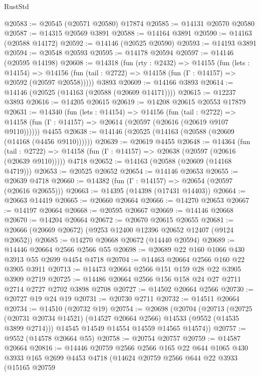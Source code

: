 \begin{lexlean}{RustStd}
\begin{coremodule}
@20583 := @20545 (@20571 @20580) @17874
@20585 := @14131 @20570 @20580
@20587 := @14315 @20569 @3891
@20588 := @14164 @3891
@20590 := @14163 (@20588 @14172)
@20592 := @14146 (@20525 @20590)
@20593 := @14193 @3891
@20594 := @20548 @20593
@20595 := @14178 @20594
@20597 := @14146 (@20595 @14198)
@20608 := @14318
    (fun (rty : @2432) =>
    @14155
      (fun (lets : @14154) =>
      @14156 (fun (tail : @2722) => @14158 (fun (Γ : @14157) => @20592 (@20597 @20558)))))
    @3893
@20609 := @14166 @3893
@20614 := @14146 (@20525 (@14163 (@20588 (@20609 @14171))))
@20615 := @12237 @3893
@20616 := @14205 @20615
@20619 := @14208 @20615 @20553 @17879
@20631 := @14340
    (fun (lets : @14154) =>
    @14156
      (fun (tail : @2722) =>
      @14158 (fun (Γ : @14157) => @20614 (@20597 (@20616 (@20619 @9107 @9110))))))
    @4455
@20638 := @14146 (@20525 (@14163 (@20588 (@20609 (@14168 (@4456 @9110))))))
@20639 := @20619 @4455
@20648 := @14364
    (fun (tail : @2722) => @14158 (fun (Γ : @14157) => @20638 (@20597 (@20616 (@20639 @9110)))))
    @4718
@20652 := @14163 (@20588 (@20609 (@14168 @4719)))
@20653 := @20525 @20652
@20654 := @14146 @20653
@20655 := @20639 @4718
@20660 := @14382 (fun (Γ : @14157) => @20654 (@20597 (@20616 @20655)))
@20663 := @14395 (@14398 (@17431 @14403))
@20664 := @20663 @14419
@20665 := @20660 @20664
@20666 := @14270 @20653
@20667 := @14197 @20664
@20668 := @20595 @20667
@20669 := @14146 @20668
@20670 := @14204 @20664
@20672 := @20670 @20615 @20655
@20681 := @20666 (@20669 @20672) (@9253 @12400 @12396 @20652 @12407 (@9124 @20652))
@20685 := @14270 @20668 @20672 (@14440 @20594)
@20689 := @14446 @20664 @2566 @2566 @55
@20698 := @20689 @22 @160 @1066 @430 @3913 @55 @2699 @4454 @4718
@20704 := @14463 @20664 @2566 @160 @22 @3905 @3911
@20713 := @14473 @20664 @2566 @151 @159 @28 @22 @3905 @3909 @2719
@20725 := @14486 @20664 @2566 @156 @158 @24 @27 @2711 @2714 @2727 @2702 @3898 @2708
@20727 := @14502 @20664 @2566
@20730 := @20727 @19 @24 @19
@20731 := @20730 @2711
@20732 := @14511 @20664
@20734 := @14510 (@20732 @19)
@20754 := @20698
    (@20704
      (@20713
        (@20725 (@20731 @20734 @14521) (@14527 @20664 @2566) @14533 (@9552 (@14535 @3899 @2714)))
        @14545
        @14549
        @14554
        @14559
        @14565
        @14574))
@20757 := @9552 (@14578 @20664 @55)
@20758 := @20754 @20757
@20759 := @14587 @20664
@20816 := @14446
    @20759
    @2566
    @2566
    @165
    @22
    @644
    @1065
    @430
    @3933
    @165
    @2699
    @4453
    @4718
    (@14624
      @20759
      @2566
      @644
      @22
      @3933
      (@15165
        @20759

\end{coremodule}
\end{lexlean}
